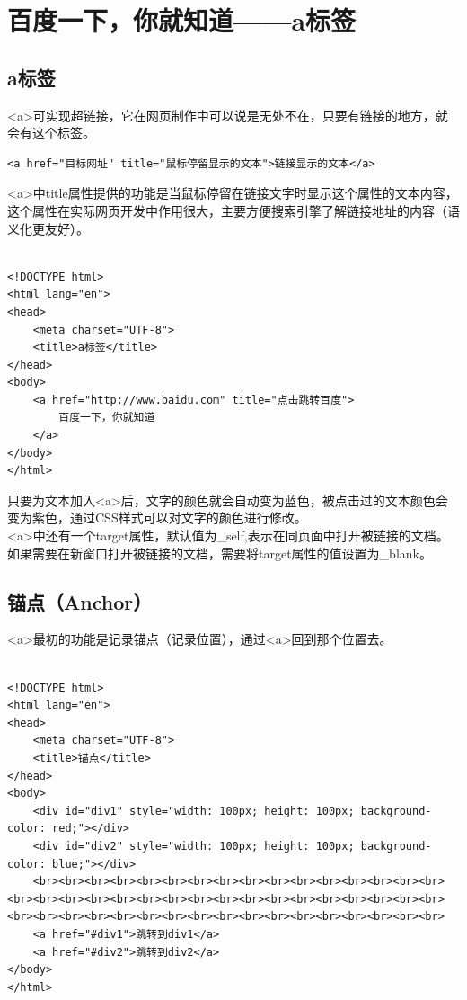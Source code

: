 \newpage

\section{百度一下，你就知道——a标签}

\subsection{a标签}

<a>可实现超链接，它在网页制作中可以说是无处不在，只要有链接的地方，就会有这个标签。 \\

\begin{lstlisting}[style=htmlcssjs]
<a href="目标网址" title="鼠标停留显示的文本">链接显示的文本</a>
\end{lstlisting}

<a>中title属性提供的功能是当鼠标停留在链接文字时显示这个属性的文本内容，这个属性在实际网页开发中作用很大，主要方便搜索引擎了解链接地址的内容（语义化更友好）。 \\

 \\

\begin{lstlisting}[style=htmlcssjs]
<!DOCTYPE html>
<html lang="en">
<head>
    <meta charset="UTF-8">
    <title>a标签</title>
</head>
<body>
    <a href="http://www.baidu.com" title="点击跳转百度">
        百度一下，你就知道
    </a>
</body>
</html>
\end{lstlisting}

只要为文本加入<a>后，文字的颜色就会自动变为蓝色，被点击过的文本颜色会变为紫色，通过CSS样式可以对文字的颜色进行修改。 \\

<a>中还有一个target属性，默认值为\_self,表示在同页面中打开被链接的文档。如果需要在新窗口打开被链接的文档，需要将target属性的值设置为\_blank。

\subsection{锚点（Anchor）}

<a>最初的功能是记录锚点（记录位置），通过<a>回到那个位置去。 \\

 \\

\begin{lstlisting}[style=htmlcssjs, breaklines=true, breakatwhitespace=false]
<!DOCTYPE html>
<html lang="en">
<head>
    <meta charset="UTF-8">
    <title>锚点</title>
</head>
<body>
    <div id="div1" style="width: 100px; height: 100px; background-color: red;"></div>
    <div id="div2" style="width: 100px; height: 100px; background-color: blue;"></div>
    <br><br><br><br><br><br><br><br><br><br><br><br><br><br><br><br><br><br><br><br><br><br><br><br><br><br><br><br><br><br><br><br><br><br><br><br><br><br><br><br><br><br><br><br><br><br><br><br><br><br>
    <a href="#div1">跳转到div1</a>
    <a href="#div2">跳转到div2</a>
</body>
</html>
\end{lstlisting}

